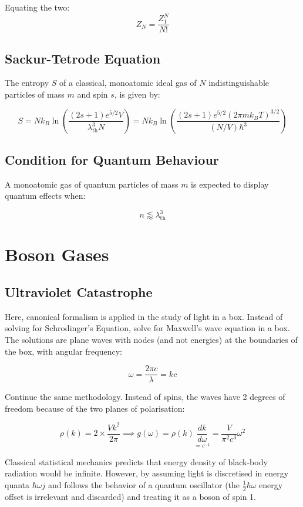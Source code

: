 \documentclass[12pt]{article}
\begin{document}
Equating the two:
\[ Z_N = \frac{Z_1^N}{N!}\]

\subsection{Sackur-Tetrode Equation}

The entropy $S$ of a classical, monoatomic ideal gas of $N$ indistinguishable particles of mass $m$ and spin $s$, is given by:

\[\boxed{ 
S = Nk_B\ln\left(\frac{(2s+1)e^{5/2}V}{\lambda^3_\text{th}N}
\right) =
Nk_B\ln\left(\frac{(2s+1)e^{5/2}(2\pi m k_B T)^{3/2}}{(N/V)\hbar^3}
\right)
}\]

\subsection{Condition for Quantum Behaviour}

A monoatomic gas of quantum particles of mass $m$ is expected to display quantum effects when:

\[\boxed{n \lessapprox \lambda_\text{th}^3}\]


\section{Boson Gases}

\subsection{Ultraviolet Catastrophe}

Here, canonical formalism is applied in the study of light in a box. Instead of solving for Schrodinger's Equation, solve for Maxwell's wave equation in a box. The solutions are plane waves with nodes (and not energies) at the boundaries of the box, with angular frequency:

\[\omega = \frac{2\pi c}{\lambda} = kc\]

Continue the same methodology. Instead of spins, the waves have 2 degrees of freedom because of the two planes of polarisation:

\[\rho(k) = 2\times \frac{Vk^2}{2\pi} \implies g(\omega) = \rho(k) 
\underset{=c^{-1}}{\frac{dk}{d\omega}}= \frac{V}{\pi^2c^3}\omega^2\]

Classical statistical mechanics predicts that energy density of black-body radiation would be infinite. However, by assuming light is discretised in energy quanta $\hbar \omega j$ and follows the behavior of a quantum oscillator (the $\frac12\hbar\omega$ energy offset is irrelevant and discarded) and treating it as a boson of spin 1.
\end{document}
